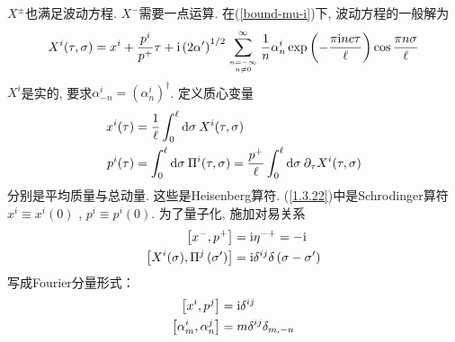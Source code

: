 $X^\pm$也满足波动方程. $X^-$需要一点运算. 在(\ref{bound-mu-i})下, 波动方程的一般解为
\begin{equation}
X^{i}(\tau, \sigma)=x^{i}+\frac{p^{i}}{p^{+}} \tau+\mathrm{i}\left(2 \alpha^{\prime}\right)^{1 / 2} \sum_{n=-\infty \atop n \neq 0}^{\infty} \frac{1}{n} \alpha_{n}^{i} \exp \left(-\frac{\pi \mathrm{i} n c \tau}{\ell}\right) \cos \frac{\pi n \sigma}{\ell} \label{1.3.22}
\end{equation}
$X^i$是实的, 要求$\alpha_{-n}^{i}=\left(\alpha_{n}^{i}\right)^{\dagger}$. 定义质心变量
\begin{subequations}
\begin{align}
x^{i}(\tau)&=\frac{1}{\ell} \int_{0}^{\ell} \mathrm{d} \sigma\: X^{i}(\tau, \sigma) \\
p^{i}(\tau)&=\int_{0}^{\ell} \mathrm{d} \sigma\: \Pi^{i}(\tau, \sigma)=\frac{p^{+}}{\ell} \int_{0}^{\ell} \mathrm{d} \sigma \:\partial_{\tau} X^{i}(\tau, \sigma)
\end{align}
\end{subequations}
分别是平均质量与总动量. 
这些是Heisenberg算符. (\ref{1.3.22})中是Schrodinger算符$x^{i} \equiv x^{i}(0)$ ,  $p^{i} \equiv p^{i}(0)$.
为了量子化, 施加对易关系
\begin{subequations}
\begin{align}
\left[x^{-}, p^{+}\right]&=\mathrm{i} \eta^{-+}=-\mathrm{i}  \label{1.3.24a}\\
\left[X^{i}(\sigma), \Pi^{j}\left(\sigma^{\prime}\right)\right]&=\mathrm{i} \delta^{i j} \delta\left(\sigma-\sigma^{\prime}\right)
\label{1.3.24b}
\end{align}
\end{subequations}
写成Fourier分量形式：
\begin{subequations}
\begin{align}
\left[x^{i}, p^{j}\right]&=\mathrm{i} \delta^{i j}   \label{1.3.25a}\\
\left[\alpha_{m}^{i}, \alpha_{n}^{j}\right]&=m \delta^{i j} \delta_{m,-n}   \label{1.3.25b}
\end{align} \label{transverse-commutator}
\end{subequations}
